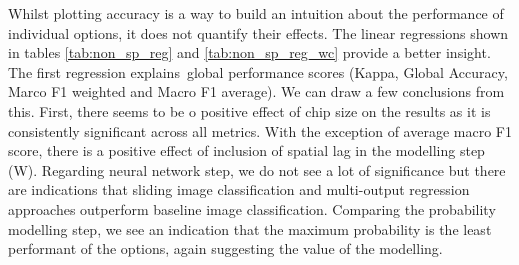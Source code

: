 Whilst plotting accuracy is a way to build an intuition about the performance of
individual options, it does not quantify their effects. The linear regressions shown in
tables \ref{tab:non_sp_reg} and \ref{tab:non_sp_reg_wc} provide a better insight. The
first regression explains\ global performance scores (Kappa, Global Accuracy, Marco F1
weighted and Macro F1 average). We can draw a few conclusions from this. First, there
seems to be o positive effect of chip size on the results as it is consistently
significant across all metrics. With the exception of average macro F1 score, there is a
positive effect of inclusion of spatial lag in the modelling step (W). Regarding neural
network step, we do not see a lot of significance but there are indications that sliding
image classification and multi-output regression approaches outperform baseline image
classification. Comparing the probability modelling step, we see an indication that the
maximum probability is the least performant of the options, again suggesting the value
of the modelling.


